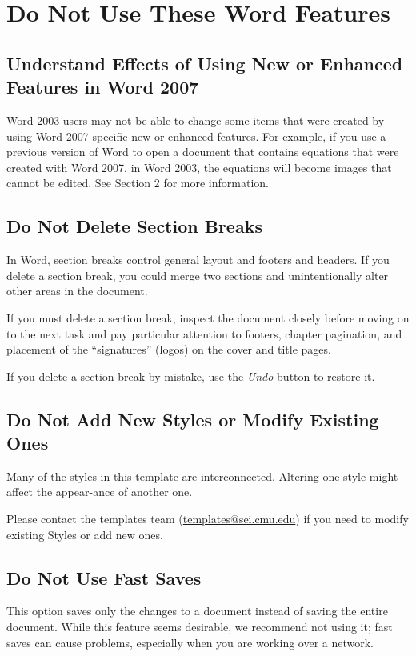 \chapter{Do Not Use These Word Features}\label{ch:donotuse}

\section{Understand Effects of Using New or Enhanced Features in Word 2007}
Word 2003 users may not be able to change some items that were created by using Word 2007-specific new or enhanced features. For example, if you use a previous version of Word to open a document that contains equations that were created with Word 2007, in Word 2003, the equations will become images that cannot be edited. See Section 2 for more information.

\section{Do Not Delete Section Breaks}
In Word, section breaks control general layout and footers and headers. If you delete a section break, you could merge two sections and unintentionally alter other areas in the document.

If you must delete a section break, inspect the document closely before moving on to the next task and pay particular attention to footers, chapter pagination, and placement of the ``signatures'' (logos) on the cover and title pages.

If you delete a section break by mistake, use the \textit{Undo} button to restore it.

\section{Do Not Add New Styles or Modify Existing Ones}
Many of the styles in this template are interconnected. Altering one style might affect the appear-ance of another one.

Please contact the templates team (\href{mailto:templates@sei.cmu.edu}{templates@sei.cmu.edu}) if you need to modify existing Styles or add new ones.

\section{Do Not Use Fast Saves}
This option saves only the changes to a document instead of saving the entire document. While this feature seems desirable, we recommend not using it; fast saves can cause problems, especially when you are working over a network.

